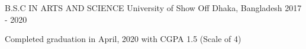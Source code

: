 \begin{cventries}
  \cventry
    {B.S.C IN ARTS AND SCIENCE}
    {University of Show Off}
    {Dhaka, Bangladesh}
    {2017 - 2020}
    {
      \vspace{-5mm}
      \begin{cvitems}
      \item {Completed graduation in April, 2020 with CGPA 1.5 (Scale of 4)}
      \end{cvitems}
  }
\end{cventries}

